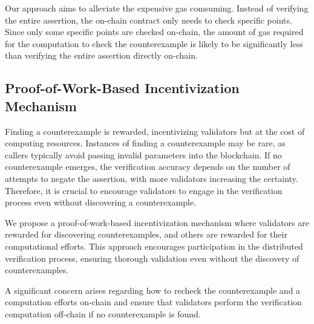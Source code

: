 \documentclass[runningheads]{llncs}
\begin{document}
Our approach aims to alleviate the expensive gas comsuming. Instead of verifying the entire assertion, the on-chain contract only needs to check specific points. Since only some specific points are checked on-chain, the amount of gas required for the computation to check the counterexample is likely to be significantly less than verifying the entire assertion directly on-chain.
\subsection{Proof-of-Work-Based Incentivization Mechanism}
Finding a counterexample is rewarded, incentivizing validators but at the cost of computing resources. Instances of finding a counterexample may be rare, as callers typically avoid passing invalid parameters into the blockchain. If no counterexample emerges, the verification accuracy depends on the number of attempts to negate the assertion, with more validators increasing the certainty. Therefore, it is crucial to encourage validators to engage in the verification process even without discovering a counterexample. %

We propose a proof-of-work-based incentivization mechanism where validators are rewarded for discovering counterexamples, and others are rewarded for their computational efforts. This approach encourages participation in the distributed verification process, ensuring thorough validation even without the discovery of counterexamples.

A significant concern arises regarding how to recheck the counterexample and a computation efforts on-chain and ensure that validators perform the verification computation off-chain if no counterexample is found.
\end{document}
